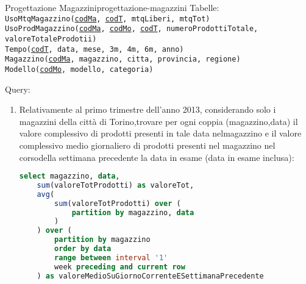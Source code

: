 \documentclass[12pt]{article}
\begin{document}
\begin{problem}{Progettazione Magazzini}{progettazione-magazzini}
    Tabelle: \\
    \texttt{UsoMtqMagazzino(\underline{codMa}, \underline{codT}, mtqLiberi, mtqTot) \\
    UsoProdMagazzino(\underline{codMa}, \underline{codMo}, \underline{codT}, numeroProdottiTotale, valoreTotaleProdotii) \\
    Tempo(\underline{codT}, data, mese, 3m, 4m, 6m, anno) \\
    Magazzino(\underline{codMa}, magazzino, citta, provincia, regione) \\
Modello(\underline{codMo}, modello, categoria)}

    Query:
    \begin{enumerate}
        \item Relativamente al primo trimestre dell’anno 2013, considerando solo i magazzini della città di Torino,trovare per ogni coppia (magazzino,data) il valore complessivo di prodotti presenti in tale data nelmagazzino e il valore complessivo medio giornaliero di prodotti presenti nel magazzino nel corsodella settimana precedente la data in esame (data in esame inclusa):
\begin{lstlisting}[language=sql]
select magazzino, data,
    sum(valoreTotProdotti) as valoreTot,
    avg(
        sum(valoreTotProdotti) over (
            partition by magazzino, data
        )
    ) over (
        partition by magazzino
        order by data
        range between interval '1'
        week preceding and current row
    ) as valoreMedioSuGiornoCorrenteESettimanaPrecedente


\end{lstlisting}
\end{enumerate}
\end{problem}
\end{document}

